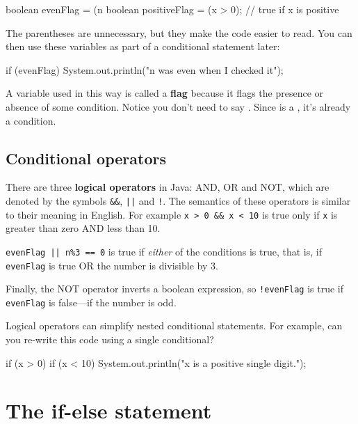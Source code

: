 \begin{code}
    boolean evenFlag = (n %
    boolean positiveFlag = (x > 0);     // true if x is positive
\end{code}

The parentheses are unnecessary, but they make the code easier to read.
You can then use these variables as part of a conditional statement later:

\begin{code}
    if (evenFlag) {
        System.out.println("n was even when I checked it");
    }
\end{code}

A variable used in this way is called a {\bf flag} because it flags the presence or absence of some condition.
Notice you don't need to say .
Since  is a , it's already a condition.

\subsection{Conditional operators}


There are three {\bf logical operators} in Java: AND, OR and NOT, which are denoted by the symbols {\tt \&\&}, {\tt ||} and {\tt !}.
The semantics of these operators is similar to their meaning in English.
For example {\tt x > 0 \&\& x < 10} is true only if {\tt x} is greater than zero AND less than 10.


{\tt evenFlag || n\%3 == 0} is true if {\em either} of the conditions is true, that is, if {\tt evenFlag} is true OR the number is divisible by 3.

Finally, the NOT operator inverts a boolean expression, so {\tt !evenFlag} is true if {\tt evenFlag} is false---if the number is odd.


Logical operators can simplify nested conditional statements.
For example, can you re-write this code using a single conditional?

\begin{code}
    if (x > 0) {
        if (x < 10) {
            System.out.println("x is a positive single digit.");
        }
    }
\end{code}


\section{The if-else statement}

